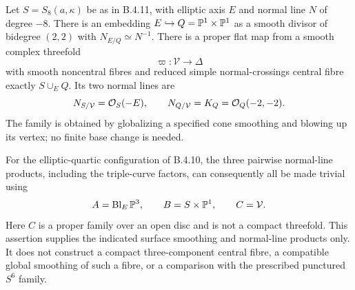 \begin{proposition}
Let $S=S_8(a,\kappa)$ be as in B.4.11, with elliptic axis $E$
and normal line $N$ of degree $-8$.
There is an embedding $E\hookrightarrow Q=\mathbb P^1\times\mathbb P^1$
as a smooth divisor of bidegree $(2,2)$ with
$N_{E/Q}\simeq N^{-1}$.
There is a proper flat map from a smooth complex threefold
\[
 \varpi:\mathcal V\longrightarrow\Delta
\]
with smooth noncentral fibres and reduced simple normal-crossings
central fibre exactly $S\cup_E Q$.  Its two normal lines are
\[
 N_{S/\mathcal V}=\mathcal O_S(-E),\qquad
 N_{Q/\mathcal V}=K_Q=\mathcal O_Q(-2,-2).
\]
The family is obtained by globalizing a specified cone smoothing
and blowing up its vertex; no finite base change is needed.

For the elliptic-quartic configuration of B.4.10, the three
pairwise normal-line products, including the triple-curve factors,
can consequently all be made trivial using
\[
 A=\operatorname{Bl}_E\mathbb P^3,\qquad
 B=S\times\mathbb P^1,\qquad C=\mathcal V.
\]
Here $C$ is a proper family over an open disc and is not a compact
threefold.  This assertion supplies the indicated surface smoothing
and normal-line products only.  It does not construct a compact
three-component central fibre, a compatible global smoothing of
such a fibre, or a comparison with the prescribed punctured
$S^6$ family.
\end{proposition}
